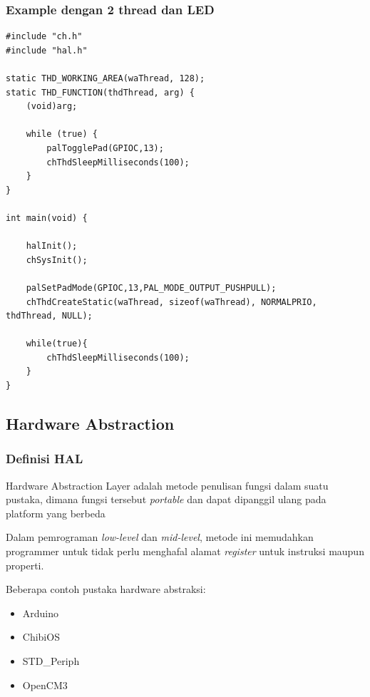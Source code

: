 \documentclass[table,dvipsnames]{beamer}
\begin{document}
		\begin{frame}[fragile]
		\frametitle{Example dengan 2 thread dan LED}
		\begin{exampleblock}{}
			\begin{verbatim}
#include "ch.h"
#include "hal.h"

static THD_WORKING_AREA(waThread, 128);
static THD_FUNCTION(thdThread, arg) {
	(void)arg;

	while (true) {
		palTogglePad(GPIOC,13);
		chThdSleepMilliseconds(100);
	}
}

int main(void) {

	halInit();
	chSysInit();

	palSetPadMode(GPIOC,13,PAL_MODE_OUTPUT_PUSHPULL);
	chThdCreateStatic(waThread, sizeof(waThread), NORMALPRIO, thdThread, NULL);

	while(true){
		chThdSleepMilliseconds(100);
	}
}
			\end{verbatim}
		\end{exampleblock}
	\end{frame}

	\subsection{Hardware Abstraction}
	\begin{frame}
		\frametitle{Definisi HAL}
		\begin{exampleblock}{}
			Hardware Abstraction Layer adalah metode penulisan fungsi dalam suatu pustaka, dimana fungsi tersebut \textit{portable}
			dan dapat dipanggil ulang pada platform yang berbeda
		\end{exampleblock}

		\begin{exampleblock}{}
			Dalam pemrograman \textit{low-level} dan \textit{mid-level}, metode ini memudahkan programmer untuk tidak perlu
			menghafal alamat \textit{register} untuk instruksi maupun properti.
		\end{exampleblock}

		\begin{exampleblock}{}
			Beberapa contoh pustaka hardware abstraksi:
			\begin{itemize}
				\item Arduino
				\item ChibiOS
				\item STD\_Periph
				\item OpenCM3
			\end{itemize}
		\end{exampleblock}
	\end{frame}
\end{document}
